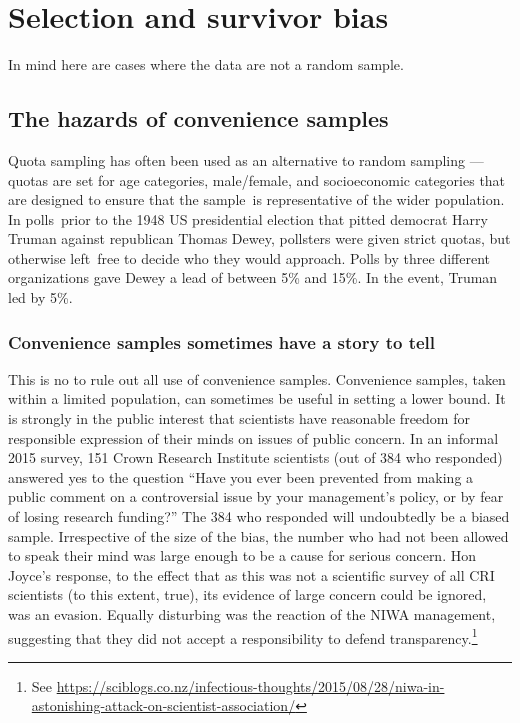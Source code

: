 \documentclass[
  10pt,
  b5paper]{book}
\begin{document}
\hypertarget{selection-and-survivor-bias}{%
\chapter{Selection and survivor bias}\label{selection-and-survivor-bias}}

In mind here are cases where the data are not a random sample.

\hypertarget{the-hazards-of-convenience-samples}{%
\section{The hazards of convenience samples}\label{the-hazards-of-convenience-samples}}

Quota sampling has often been used as an alternative to random
sampling --- quotas are set for age categories, male/female,
and socioeconomic categories that are designed to ensure that
the sample~is representative of the wider population.
In polls~prior to the 1948 US presidential election that pitted
democrat Harry Truman against republican Thomas Dewey,
pollsters were given strict quotas, but otherwise left~free to
decide who they would approach. Polls by three different
organizations gave Dewey a lead of between 5\% and 15\%. In the
event, Truman led by 5\%.

\hypertarget{convenience-samples-sometimes-have-a-story-to-tell}{%
\subsection{Convenience samples sometimes have a story to tell}\label{convenience-samples-sometimes-have-a-story-to-tell}}

This is no to rule out all use of convenience samples.
Convenience samples, taken within a limited population, can
sometimes be useful in setting a lower bound.
It is strongly in the public interest that scientists have
reasonable freedom for responsible expression of their minds
on issues of public concern. In an informal 2015 survey, 151
Crown Research Institute scientists (out of 384 who responded)
answered yes to the question ``Have you ever been prevented
from making a public comment on a controversial issue by your
management's policy, or by fear of losing research funding?''
The 384 who responded will undoubtedly be a biased sample.
Irrespective of the size of the bias, the number who had not
been allowed to speak their mind was large enough to be a cause
for serious concern. Hon Joyce's response, to the effect that
as this was not a scientific survey of all CRI scientists
(to this extent, true), its evidence of large concern could be
ignored, was an evasion. Equally disturbing was the reaction
of the NIWA management, suggesting that they did not accept a
responsibility to defend transparency.\footnote{See \url{https://sciblogs.co.nz/infectious-thoughts/2015/08/28/niwa-in-astonishing-attack-on-scientist-association/}}
\end{document}
